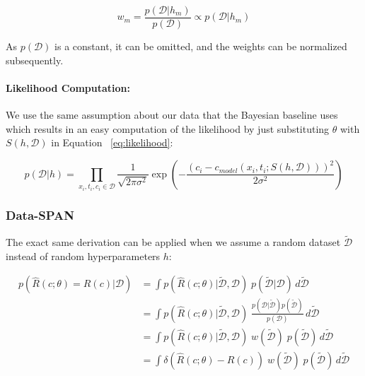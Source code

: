 \begin{equation*}
w_m = \frac{p(\mathcal{D} | h_m)}{p(\mathcal{D})} \propto p(\mathcal{D} | h_m)
\end{equation*}

As $p(\mathcal{D})$ is a constant, it can be omitted, and the weights can be normalized subsequently.


\paragraph{Likelihood Computation:}
We use the same assumption about our data that the Bayesian baseline uses which results in an easy computation of the likelihood by just substituting $\theta$ with $S(h, \mathcal{D})$ in Equation ~\vref{eq:likelihood}:

\begin{equation*}
p(\mathcal{D} | h) = \prod_{x_i, t_i, c_i \in \mathcal{D}} \frac{1}{\sqrt{2\pi \sigma^2}} \exp \left( -\frac{(c_i - c_{model}(x_i, t_i; S(h, \mathcal{D})))^2}{2\sigma^2} \right)
\end{equation*}



\subsubsection{Data-SPAN}
The exact same derivation can be applied when we assume a random dataset $\tilde{\mathcal{D}}$ instead of random hyperparameters $h$:

\begin{align*}
    p(\hat{R}(c; \theta) = R(c)| \mathcal{D}) &= \int p(\hat{R}(c; \theta) | \tilde{\mathcal{D}}, \mathcal{D})\; p(\tilde{\mathcal{D}} | \mathcal{D}) \, d \tilde{\mathcal{D}} \\
                                              &= \int p(\hat{R}(c; \theta) | \tilde{\mathcal{D}}, \mathcal{D})\; \frac{p(\mathcal{D} | \tilde{\mathcal{D}}) p(\tilde{\mathcal{D}})}{p(\mathcal{D})} \, d \tilde{\mathcal{D}} \\
                                              &= \int p(\hat{R}(c; \theta) | \tilde{\mathcal{D}}, \mathcal{D})\; w(\tilde{\mathcal{D}})\; p(\tilde{\mathcal{D}}) \, d \tilde{\mathcal{D}} \\
                                              &= \int \delta(\hat{R}(c; \theta) - R(c))\; w(\tilde{\mathcal{D}})\; p(\tilde{\mathcal{D}}) \, d \tilde{\mathcal{D}} \\
\end{align*}

